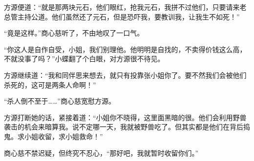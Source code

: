 \begin{this_body}
方源便道：“就是那两块元石，他们眼红，抢我元石，我拼不过他们，只要请来老总管主持公道。他们虽然还了元石，但是恐吓我，要教训我，让我生不如死！”

“竟是这样。”商心慈听了，不由地叹了一口气。

“你这人是自作自受，小姐，我们别理他。他明明是自找的，不卖得价钱这么高，不就没事了吗？”小蝶翻了个白眼，对方源很不待见。

方源继续道：“我和同伴思来想去，就只有投靠张小姐你了。要不然我们会被他们杀死的，这可是两条人命啊！”

“杀人倒不至于……”商心慈宽慰方源。

方源打断她的话，紧接着道：“小姐你不晓得，这里面黑暗的很。他们会利用野兽袭击的机会来暗算我。说不定哪一天，我就被野兽吃了。但其实都是他们在背后捣鬼。求小姐收留，求小姐救命！”

商心慈不禁迟疑，但终究不忍心，“那好吧，我就暂时收留你们。”

\end{this_body}

